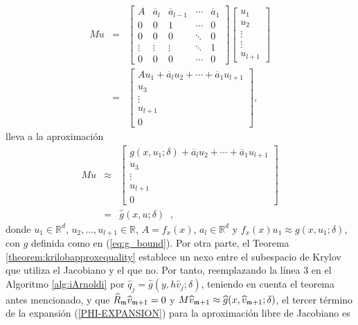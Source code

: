 \begin{eqnarray*}
	Mu & = & \left[
	\begin{array}{ccccc}
		A & \overline{a}_{l} & \overline{a}_{l-1} & \cdots  & \overline{a}_{1} \\
		0 & 0 & 1 & \cdots  & 0 \\
		0 & 0 & 0 & \ddots  & 0 \\
		\vdots  & \vdots  & \vdots  & \ddots  & 1 \\
		0 & 0 & 0 & \cdots  & 0
	\end{array}
	\right] \left[
	\begin{array}{c}
		u_{1} \\
		u_{2} \\
		\vdots  \\
		\vdots  \\
		u_{l+1}
	\end{array}
	\right]  \\
	& = & 	\left[
	\begin{array}{c}
		Au_{1}+\overline{a}_{l}u_{2}+\cdots +\overline{a}_{1}u_{l+1} \\
		u_{3} \\
		\vdots  \\
		u_{l+1} \\
		0
	\end{array}
	\right] ,
\end{eqnarray*}
lleva a la aproximación
\begin{eqnarray*}
Mu	& \approx &  	\left[
	\begin{array}{c}
		g(x,u_1;\delta)+\overline{a}_{l}u_{2}+\cdots +\overline{a}_{1}u_{l+1} \\
		u_{3} \\
		\vdots  \\
		u_{l+1} \\
		0
	\end{array}
	\right] \\
	& = &
	\widehat{g}(x,u;\delta)\;\;,
\end{eqnarray*}
donde $u_1\in\mathbb{R}^{d}$, $u_2,\ldots,u_{l+1}\in\mathbb{R}$, $A=f_x(x)$, $a_l\in \mathbb{R}^d$ y $f_x(x)u_1\approx g(x,u_1;\delta)$, con $g$ definida como en (\ref{eq:g_bound}). Por otra parte, el Teorema \ref{theorem:krilobapproxequality} establece un nexo entre el subespacio de Krylov que utiliza el Jacobiano y el que no. Por tanto, reemplazando la línea 3  en el Algoritmo \ref{alg:iArnoldi}  por $\widehat{q}_j=\widehat{g}(y,h \widehat{v}_j;\delta)$, teniendo en cuenta el teorema antes mencionado, y que $\widehat{R}_{\mathfrak{m}} \widehat{v}_{\mathfrak{m}+1}=0$ y $M\widehat{v}_{\mathfrak{m}+1}\approx \widehat{g}(x,\widehat{v}_{\mathfrak{m}+1};\delta)$, el tercer término de la expansión (\ref{PHI-EXPANSION}) para la aproximación libre de Jacobiano es \cite{naranjo2023jacobian}
